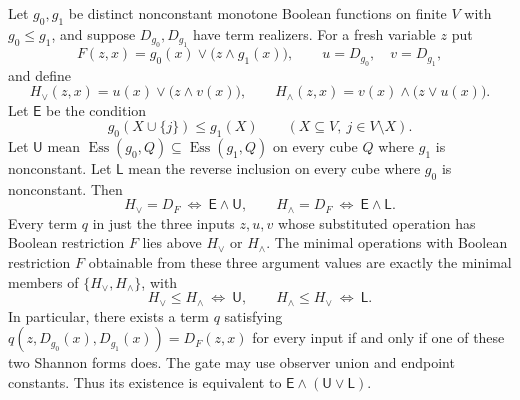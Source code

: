 \begin{theorem}
\label{core:thm:canonical-cofactor-gates}
Let $g_0,g_1$ be distinct nonconstant monotone Boolean functions on
finite $V$ with $g_0\leq g_1$, and suppose $D_{g_0},D_{g_1}$ have
term realizers.
For a fresh variable $z$ put
\[
 F(z,x)=g_0(x)\vee\bigl(z\wedge g_1(x)\bigr),
 \qquad u=D_{g_0},\quad v=D_{g_1},
\]
and define
\[
 H_\vee(z,x)=u(x)\vee\bigl(z\wedge v(x)\bigr),\qquad
 H_\wedge(z,x)=v(x)\wedge\bigl(z\vee u(x)\bigr).
\]
Let $\mathsf E$ be the condition
\[
 g_0(X\cup\{j\})\leq g_1(X)
 \qquad(X\subseteq V,\ j\in V\setminus X).
\]
Let $\mathsf U$ mean
$\operatorname{Ess}(g_0,Q)\subseteq\operatorname{Ess}(g_1,Q)$ on every
cube $Q$ where $g_1$ is nonconstant. Let $\mathsf L$ mean the reverse
inclusion on every cube where $g_0$ is nonconstant. Then
\[
 H_\vee=D_F\ \Longleftrightarrow\ \mathsf E\land\mathsf U,
 \qquad
 H_\wedge=D_F\ \Longleftrightarrow\ \mathsf E\land\mathsf L.
\]
Every term $q$ in just the three inputs $z,u,v$ whose substituted
operation has Boolean restriction $F$ lies above $H_\vee$ or $H_\wedge$.
The minimal operations with Boolean restriction $F$ obtainable from
these three argument values are exactly the minimal members of
$\{H_\vee,H_\wedge\}$, with
\[
 H_\vee\leq H_\wedge\ \Longleftrightarrow\ \mathsf U,
 \qquad
 H_\wedge\leq H_\vee\ \Longleftrightarrow\ \mathsf L.
\]
In particular, there exists a term $q$ satisfying
$q(z,D_{g_0}(x),D_{g_1}(x))=D_F(z,x)$ for every input if and only if
one of these two Shannon forms does. The gate may use observer union
and endpoint constants. Thus its existence is equivalent to
$\mathsf E\land(\mathsf U\lor\mathsf L)$.
\end{theorem}
